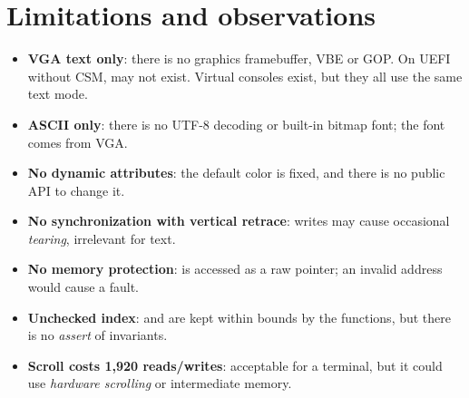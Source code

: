 \section{Limitations and observations}

\begin{itemize}
  \item \textbf{VGA text only}: there is no graphics framebuffer, VBE or
        GOP. On UEFI without CSM,  may not exist. Virtual
        consoles exist, but they all use the same text mode.
  \item \textbf{ASCII only}: there is no UTF-8 decoding or
        built-in bitmap font; the font comes from VGA.
  \item \textbf{No dynamic attributes}: the default color is fixed,
        and there is no public API to change it.
  \item \textbf{No synchronization with vertical retrace}: writes
        may cause occasional \emph{tearing}, irrelevant for text.
  \item \textbf{No memory protection}:  is accessed
        as a raw pointer; an invalid address would cause a fault.
  \item \textbf{Unchecked index}:  and 
        are kept within bounds by the functions, but there is no
        \emph{assert} of invariants.
  \item \textbf{Scroll costs 1,920 reads/writes}: acceptable for a
        terminal, but it could use \emph{hardware scrolling} or intermediate
        memory.
\end{itemize}

